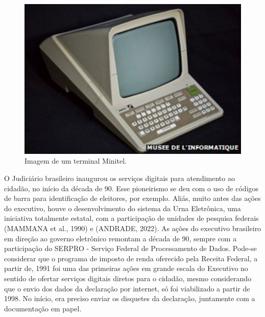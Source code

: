\captionsetup{format=plain}
\begin{figure}[htb]

\centering


\begin{minipage}[b]{0.4\linewidth}
        \centering
                \includegraphics[width=1.0\linewidth]{../../../imagens/minitel.jpg}
                \caption{Imagem de um terminal Minitel.}
                \label{5d9a2782548e094108d5241aeff768916b33be6c}
\end{minipage}%
\hspace{0.5cm}
\end{figure}



O Judiciário brasileiro inaugurou os serviços digitais para atendimento ao cidadão, no início da década de 90. Esse pioneirismo se deu com o uso de códigos de barra para identificação de eleitores, por exemplo. Aliás, muito antes das ações do executivo, houve o desenvolvimento do sistema da Urna Eletrônica, uma iniciativa totalmente estatal, com a participação de unidades de pesquisa federais (MAMMANA et al., 1990) e (ANDRADE, 2022). As ações do executivo brasileiro em direção ao governo eletrônico remontam a década de 90, sempre com a participação do SERPRO - Serviço Federal de Processamento de Dados. Pode-se considerar que o programa de imposto de renda oferecido pela Receita Federal, a partir de, 1991 foi uma das primeiras ações em grande escala do Executivo no sentido de ofertar serviços digitais diretos para o cidadão, mesmo considerando que o envio dos dados da declaração por internet, só foi viabilizado a partir de 1998. No início, era preciso enviar os disquetes da declaração, juntamente com a documentação em papel.


